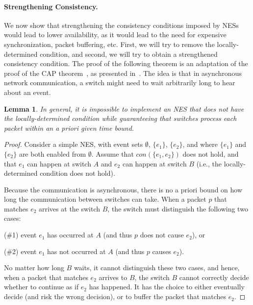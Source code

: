\documentclass[pldi-cameraready]{sigplanconf}
\newcommand*\xmnote[3][0pt]{}
\newtheorem{lemma}{Lemma}
\begin{document}
\paragraph*{Strengthening Consistency.}
\renewcommand*{\proofname}{Proof Sketch}We now show that strengthening the consistency conditions imposed by
NESs would lead to lower availability, as it would lead to the need
for expensive synchronization, packet buffering, etc. First, we will
try to remove the locally-determined condition, and second, we will try to obtain a
strengthened consistency condition. The proof of the following theorem
is an adaptation of the proof of the CAP theorem~\cite{B00}, as
presented in~\cite{GL12}. The idea is that in asynchronous network
communication, a switch might need to wait arbitrarily long to hear
\xmnote{\FiveStar}{Q14}about an event.
\begin{lemma}
\label{lem:local}
In general, it is impossible to implement an NES that does not have 
the locally-determined condition while guaranteeing that switches
process each packet within an {a priori} given time bound.
\end{lemma}
\begin{proof}
Consider a simple NES, with event sets
$\emptyset$, $\{e_1\}$, $\{e_2\}$, and where $\{e_1\}$ and $\{e_2\}$ are both enabled from 
$\emptyset$. Assume that $con(\{e_1,e_2\})$ does not hold,
and that $e_1$ can happen at switch $A$ and $e_2$ 
can happen at switch $B$ (i.e., the locally-determined condition does not
hold). 

Because the communication is asynchronous, there is no a priori
bound on how long the communication between switches can take.
When a packet $p$ that matches $e_2$ arrives at the switch $B$, the switch must
distinguish the following two cases: 
\begin{inparaenum}
\item[(\#1)] event $e_1$ has occurred at $A$ (and thus $p$ does not cause
  $e_2$), or
\item[(\#2)] event $e_1$ has not occurred at $A$ (and thus $p$ causes 
  $e_2$).
\end{inparaenum}
No matter how long $B$ waits, it cannot distinguish these two cases,
and hence, when a packet that matches $e_2$ arrives to $B$, the switch
$B$ cannot
correctly decide whether to continue as if $e_2$ has happened. It has
the choice to either eventually decide (and risk the wrong decision),
or to buffer the packet that matches $e_2$.  
\end{proof}
\end{document}
